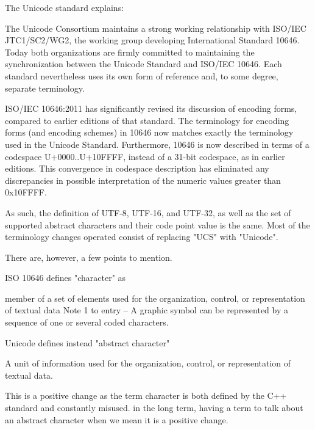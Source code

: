 \documentclass{wg21}
\begin{document}
The Unicode standard explains:

\begin{quoteblock}
The Unicode Consortium maintains a strong working relationship with ISO/IEC
JTC1/SC2/WG2, the working group developing International Standard 10646. Today both
organizations are firmly committed to maintaining the synchronization between the Unicode Standard and ISO/IEC 10646. Each standard nevertheless uses its own form of reference and, to some degree, separate terminology.
\end{quoteblock}

\begin{quoteblock}
ISO/IEC 10646:2011 has significantly revised its discussion of encoding forms, compared
to earlier editions of that standard. The terminology for encoding forms (and encoding
schemes) in 10646 now matches exactly the terminology used in the Unicode Standard.
Furthermore, 10646 is now described in terms of a codespace U+0000..U+10FFFF, instead
of a 31-bit codespace, as in earlier editions. This convergence in codespace description has
eliminated any discrepancies in possible interpretation of the numeric values greater than
0x10FFFF.
\end{quoteblock}

As such, the definition of UTF-8, UTF-16, and UTF-32, as well as the set of supported abstract characters and their code point value is the same.
Most of the terminology changes operated consist of replacing "UCS" with "Unicode".

There are, however, a few points to mention.

ISO 10646 defines "character" as
\begin{quoteblock}
member of a set of elements used for the organization, control, or representation of textual data
Note 1 to entry – A graphic symbol can be represented by a sequence of one or several coded characters.
\end{quoteblock}

Unicode defines instead "abstract character"
\begin{quoteblock}
A unit of information used for the organization, control, or representation of textual data.
\end{quoteblock}

This is a positive change as the term character is both defined by the C++ standard and constantly misused.
in the long term, having a term to talk about an abstract character when we mean it is a positive change.
\end{document}
